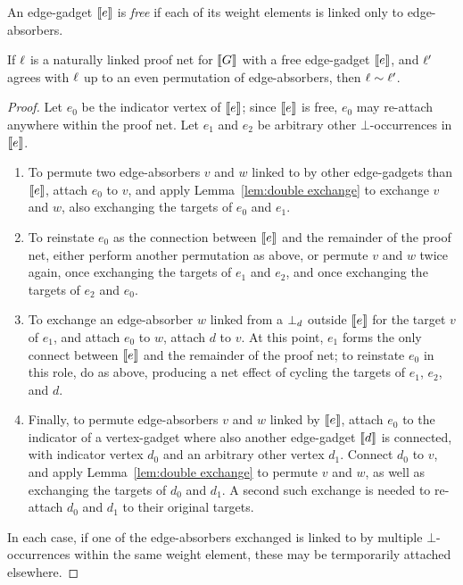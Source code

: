 An edge-gadget $\llbracket e\rrbracket$ is \emph{free} if each of its weight elements is linked only to edge-absorbers.


\begin{lemma}
\label{lem:permute edge-absorbers}
If $\ell$ is a naturally linked proof net for $\llbracket G\rrbracket$ with a free edge-gadget $\llbracket e\rrbracket$, and $\ell'$ agrees with $\ell$ up to an even permutation of edge-absorbers, then $\ell\sim\ell'$.
\end{lemma}

\begin{proof}
Let $e_0$ be the indicator vertex of $\llbracket e\rrbracket$; since $\llbracket e\rrbracket$ is free, $e_0$ may re-attach anywhere within the proof net.
%
Let $e_1$ and $e_2$ be arbitrary other $\bot$-occurrences in $\llbracket e\rrbracket$.

\begin{enumerate}

	\item
To permute two edge-absorbers $v$ and $w$ linked to by other edge-gadgets than $\llbracket e\rrbracket$, attach $e_0$ to $v$, and apply Lemma~\ref{lem:double exchange} to exchange $v$ and $w$, also exchanging the targets of $e_0$ and $e_1$.

	\item
To reinstate $e_0$ as the connection between $\llbracket e\rrbracket$ and the remainder of the proof net, either perform another permutation as above, or permute $v$ and $w$ twice again, once exchanging the targets of $e_1$ and $e_2$, and once exchanging the targets of $e_2$ and $e_0$.

	\item
To exchange an edge-absorber $w$ linked from a $\bot_{d}$ outside $\llbracket e\rrbracket$ for the target $v$ of $e_1$, and attach $e_0$ to $w$, attach $d$ to $v$.
%
At this point, $e_1$ forms the only connect between $\llbracket e\rrbracket$ and the remainder of the proof net; to reinstate $e_0$ in this role, do as above, producing a net effect of cycling the targets of $e_1$, $e_2$, and $d$.

	\item
Finally, to permute edge-absorbers $v$ and $w$ linked by $\llbracket e\rrbracket$, attach $e_0$ to the indicator of a vertex-gadget where also another edge-gadget $\llbracket d\rrbracket$ is connected, with indicator vertex $d_0$ and an arbitrary other vertex $d_1$.
%
Connect $d_0$ to $v$, and apply Lemma~\ref{lem:double exchange} to permute $v$ and $w$, as well as exchanging the targets of $d_0$ and $d_1$.
%
A second such exchange is needed to re-attach $d_0$ and $d_1$ to their original targets.

\end{enumerate}

In each case, if one of the edge-absorbers exchanged is linked to by multiple $\bot$-occurrences within the same weight element, these may be termporarily attached elsewhere.

\end{proof}


